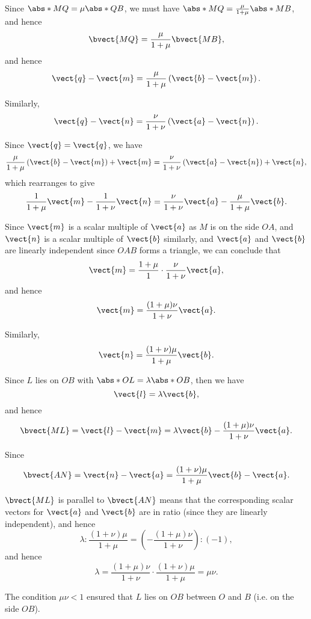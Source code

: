 \Question{\currfilebase}

Since \(\abs*{MQ} = \mu \abs*{QB}\), we must have \(\abs*{MQ} = \frac{\mu}{1 + \mu} \abs*{MB}\), and hence
\[
    \bvect{MQ} = \frac{\mu}{1 + \mu} \bvect{MB},
\]
and hence
\[
    \vect{q} - \vect{m} = \frac{\mu}{1 + \mu} \left(\vect{b} - \vect{m}\right).
\]

Similarly,
\[
    \vect{q} - \vect{n} = \frac{\nu}{1 + \nu} \left(\vect{a} - \vect{n}\right).
\]

Since \(\vect{q} = \vect{q}\), we have
\[
    \frac{\mu}{1 + \mu} \left(\vect{b} - \vect{m}\right) + \vect{m} = \frac{\nu}{1 + \nu} \left(\vect{a} - \vect{n}\right) + \vect{n},
\]
which rearranges to give
\[
    \frac{1}{1 + \mu} \vect{m} - \frac{1}{1 + \nu} \vect{n} = \frac{\nu}{1 + \nu} \vect{a} - \frac{\mu}{1 + \mu} \vect{b}.
\]

Since \(\vect{m}\) is a scalar multiple of \(\vect{a}\) as \(M\) is on the side \(OA\), and \(\vect{n}\) is a scalar multiple of \(\vect{b}\) similarly, and \(\vect{a}\) and \(\vect{b}\) are linearly independent since \(OAB\) forms a triangle, we can conclude that
\[
    \vect{m} = \frac{1 + \mu}{1} \cdot \frac{\nu}{1 + \nu} \vect{a},
\]
and hence
\[
    \vect{m} = \frac{(1 + \mu) \nu}{1 + \nu} \vect{a}.
\]

Similarly,
\[
    \vect{n} = \frac{(1 + \nu) \mu}{1 + \mu} \vect{b}.
\]

Since \(L\) lies on \(OB\) with \(\abs*{OL} = \lambda \abs*{OB}\), then we have
\[
    \vect{l} = \lambda \vect{b},
\]
and hence
\[
    \bvect{ML} = \vect{l} - \vect{m} = \lambda \vect{b} - \frac{(1 + \mu) \nu}{1 + \nu} \vect{a}.
\]

Since
\[
    \bvect{AN} = \vect{n} - \vect{a} = \frac{(1 + \nu) \mu}{1 + \mu} \vect{b} - \vect{a}.
\]

\(\bvect{ML}\) is parallel to \(\bvect{AN}\) means that the corresponding scalar vectors for \(\vect{a}\) and \(\vect{b}\) are in ratio (since they are linearly independent), and hence
\[
    \lambda : \frac{(1 + \nu) \mu}{1 + \mu} = \left(- \frac{(1 + \mu) \nu}{1 + \nu}\right) : (-1),
\]
and hence
\[
    \lambda = \frac{(1 + \mu) \nu}{1 + \nu} \cdot \frac{(1 + \nu) \mu}{1 + \mu} = \mu \nu.
\]

The condition \(\mu \nu < 1\) ensured that \(L\) lies on \(OB\) between \(O\) and \(B\) (i.e. on the side \(OB\)).